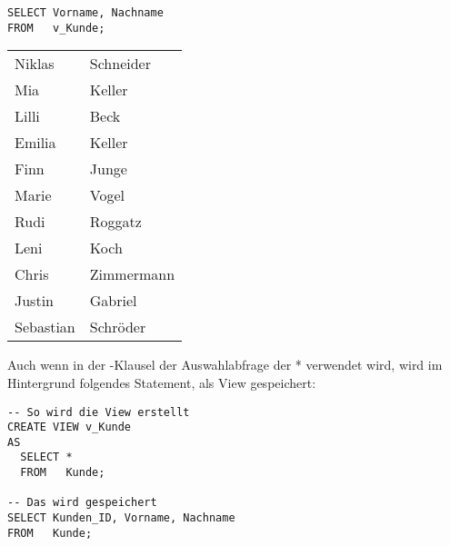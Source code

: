 \begin{lstlisting}[language=oracle_sql,caption={Zugriff auf eine View},label=sql08_26]
SELECT Vorname, Nachname
FROM   v_Kunde;
        \end{lstlisting}
\begin{center}
    \begin{small}
        \tablehead{}
        \begin{msoraclesql}
            \begin{supertabular}{ll}
                Niklas & Schneider \\
                Mia & Keller \\
                Lilli & Beck \\
                Emilia & Keller \\
                Finn & Junge \\
                Marie & Vogel \\
                Rudi & Roggatz \\
                Leni & Koch \\
                Chris & Zimmermann \\
                Justin & Gabriel \\
                Sebastian & Schröder \\
            \end{supertabular}
        \end{msoraclesql}
    \end{small}
\end{center}
Auch wenn in der \SELECT-Klausel der Auswahlabfrage der * verwendet wird, wird im Hintergrund folgendes Statement, als View gespeichert:
\begin{lstlisting}[language=oracle_sql,caption={Was tatsächlich gespeichert wird},label=sql08_27]
-- So wird die View erstellt
CREATE VIEW v_Kunde
AS
  SELECT *
  FROM   Kunde;

-- Das wird gespeichert
SELECT Kunden_ID, Vorname, Nachname
FROM   Kunde;
        \end{lstlisting}
